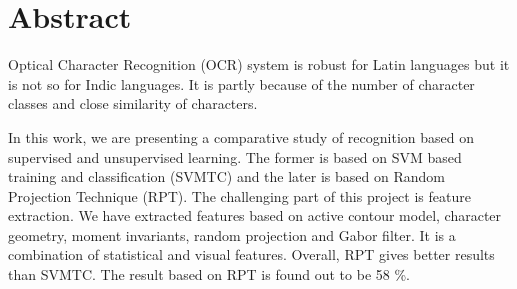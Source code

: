 
\chapter*{Abstract}



\begin{spacing}{1.5}
Optical Character Recognition (OCR) system is robust for Latin languages but it is not so for Indic languages. It is partly because of the number of character classes and close similarity of characters.

In this work, we are presenting a comparative study of recognition based on supervised and 
unsupervised learning. The former is based on SVM based training and classification (SVMTC) and the
later is based on Random Projection Technique (RPT). The challenging part of this project 
is feature  extraction. We have extracted features based on active contour model, 
character geometry, moment invariants, random projection and Gabor filter. It is a combination of 
statistical and visual features. Overall, RPT gives better results than
SVMTC. The result based on RPT is found out to be 58 \%.
\end{spacing}

